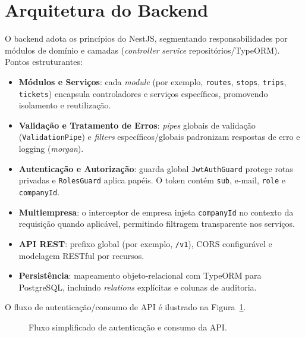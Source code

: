 \section{Arquitetura do Backend}
O backend adota os princípios do NestJS, segmentando responsabilidades por módulos de domínio e camadas (\textit{controller} \textrightarrow{} \textit{service} \textrightarrow{} repositórios/TypeORM). Pontos estruturantes:

\begin{itemize}
  \item \textbf{Módulos e Serviços}: cada \textit{module} (por exemplo, \texttt{routes}, \texttt{stops}, \texttt{trips}, \texttt{tickets}) encapsula controladores e serviços específicos, promovendo isolamento e reutilização.
  \item \textbf{Validação e Tratamento de Erros}: \textit{pipes} globais de validação (\texttt{ValidationPipe}) e \textit{filters} específicos/globais padronizam respostas de erro e logging (\textit{morgan}).
  \item \textbf{Autenticação e Autorização}: guarda global \texttt{JwtAuthGuard} protege rotas privadas e \texttt{RolesGuard} aplica papéis. O token contém \texttt{sub}, e-mail, \texttt{role} e \texttt{companyId}.
  \item \textbf{Multiempresa}: o interceptor de empresa injeta \texttt{companyId} no contexto da requisição quando aplicável, permitindo filtragem transparente nos serviços.
  \item \textbf{API REST}: prefixo global (por exemplo, \texttt{/v1}), CORS configurável e modelagem RESTful por recursos.
  \item \textbf{Persistência}: mapeamento objeto-relacional com TypeORM para PostgreSQL, incluindo \textit{relations} explícitas e colunas de auditoria.
\end{itemize}

O fluxo de autenticação/consumo de API é ilustrado na Figura~\ref{fig:fluxo-auth}.

\begin{figure}[H]
\centering
{}
\caption{Fluxo simplificado de autenticação e consumo da API.}
\label{fig:fluxo-auth}
\end{figure}

